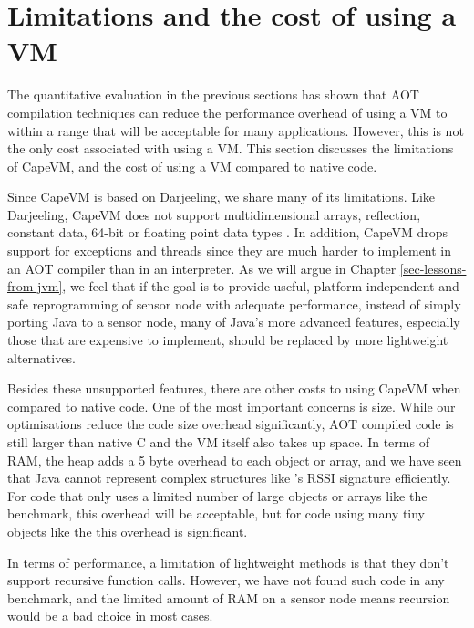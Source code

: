 \section{Limitations and the cost of using a VM}
\label{sec-evaluation-limitations}
The quantitative evaluation in the previous sections has shown that AOT compilation techniques can reduce the performance overhead of using a VM to within a range that will be acceptable for many applications. However, this is not the only cost associated with using a VM. This section discusses the limitations of CapeVM, and the cost of using a VM compared to native code.

Since CapeVM is based on Darjeeling, we share many of its limitations. Like Darjeeling, CapeVM does not support multidimensional arrays, reflection, constant data, 64-bit or floating point data types \cite{Brouwers:2009cj}. In addition, CapeVM drops support for exceptions and threads since they are much harder to implement in an AOT compiler than in an interpreter. As we will argue in Chapter \ref{sec-lessons-from-jvm}, we feel that if the goal is to provide useful, platform independent and safe reprogramming of sensor node with adequate performance, instead of simply porting Java to a sensor node, many of Java's more advanced features, especially those that are expensive to implement, should be replaced by more lightweight alternatives.

Besides these unsupported features, there are other costs to using CapeVM when compared to native code. One of the most important concerns is size. While our optimisations reduce the code size overhead significantly, AOT compiled code is still larger than native C and the VM itself also takes up space. In terms of RAM, the heap adds a 5 byte overhead to each object or array, and we have seen that Java cannot represent complex structures like 's RSSI signature efficiently. For code that only uses a limited number of large objects or arrays like the  benchmark, this overhead will be acceptable, but for code using many tiny objects like the  this overhead is significant.

In terms of performance, a limitation of lightweight methods is that they don't support recursive function calls. However, we have not found such code in any benchmark, and the limited amount of RAM on a sensor node means recursion would be a bad choice in most cases.


